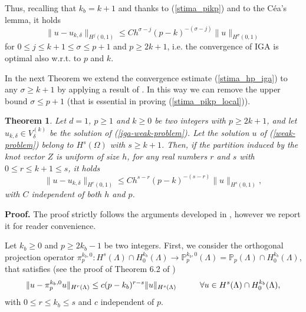 \documentclass[11pt]{article}
\newtheorem{theorem}{Theorem}
\begin{document}
Thus, recalling that $k_b=k+1$ and thanks to (\ref{stima_pikp})
and to the C\'ea's lemma, it holds
\begin{equation}\label{stima_hp_iga}
\|u-u_{k,\delta}\|_{H^j(0,1)}\leq C h^{\sigma-j}(p-k)^{-(\sigma-j)}\|u\|_{H^\sigma(0,1)}
\end{equation}
for $0\leq j\leq k+1\leq \sigma\leq p+1$  
and $p\geq 2k+1$, i.e. the convergence
of IGA is optimal also w.r.t. to $p$ and $k$. 

In the next Theorem we  extend the convergence estimate 
(\ref{stima_hp_iga}) to any 
$\sigma\geq k+1$
 by applying a result of \cite{bm-handbook}. In this way we can 
remove the upper bound $\sigma\leq p+1$ (that is essential
in proving (\ref{stima_pikp_local})).


\begin{theorem}
Let $d=1$, $p\geq 1$ and $k\geq 0$ be two integers with  $p\geq 2k+1$, and 
let $u_{k,\delta}\in V^{(k)}_\delta$ be 
the solution of (\ref{iga-weak-problem}). 
Let the solution $u$ of (\ref{weak-problem}) belong to $H^s(\Omega)$
with $s\geq k+1$. Then, if the partition induced by the knot vector $Z$ is 
uniform of size $h$, for any real numbers $r$ and $s$ with 
$0\leq r \leq k+1 \leq s$, it holds
\begin{equation}\label{stima_iga_bm}
\|u-u_{k,\delta}\|_{H^r(0,1)}\leq C h^{s-r}(p-k)^{-(s-r)}\|u\|_{H^s(0,1)},
\end{equation}
with $C$ independent of both $h$ and $p$.
\end{theorem}

{\bf Proof.}
The proof strictly follows the arguments developed in 
\cite[Sect.6]{bm-handbook}, however we report it
for reader convenience.

Let $k_b\geq 0$ and $p\geq 2k_b-1$ be two integers. First, we consider
the orthogonal projection operator $\pi_p^{k_b,0}:H^s(\Lambda)\cap
H^{k_b}_0(\Lambda)\to {\mathbb P}_p^{k_b,0}(\Lambda)=
{\mathbb P}_p(\Lambda)\cap H^{k_b}_0(\Lambda)$, that satisfies
(see the proof of Theorem 6.2 of \cite{bm-handbook})
\begin{equation}\label{stima_pik0}
\|u-\pi_p^{k_b,0}u\|_{H^r(\Lambda)}\leq c (p-k_b)^{r-s}\|u\|_{H^s(\Lambda)}
\hskip 1.cm \forall u\in H^s(\Lambda)\cap H^{k_b}_0(\Lambda),
\end{equation}
with $0\leq r\leq k_b\leq s$ and $c$ independent of $p$. 
\end{document}
